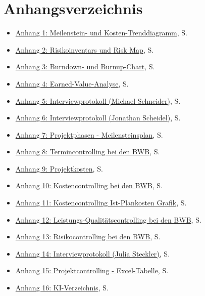 \documentclass[
    12pt, 
    a4paper,
    ]{scrartcl} %
\begin{document}
\section*{Anhangsverzeichnis}
{}
\vspace{0.6cm}
\begin{itemize}
    \item \hyperref[sec:Anhang1]{Anhang 1: Meilenstein- und Kosten-Trenddiagramm}, S. \pageref{sec:Anhang1}
    \item \hyperref[sec:Anhang2]{Anhang 2: Risikoinventars und Risk Map}, S. \pageref{sec:Anhang2}
    \item \hyperref[sec:Anhang3]{Anhang 3: Burndown- und Burnup-Chart}, S. \pageref{sec:Anhang3}
    \item \hyperref[sec:Anhang4]{Anhang 4: Earned-Value-Analyse}, S. \pageref{sec:Anhang4}
    \item \hyperref[sec:Anhang5]{Anhang 5: Interviewprotokoll (Michael Schneider)}, S. \pageref{sec:Anhang5}
    \item \hyperref[sec:Anhang6]{Anhang 6: Interviewprotokoll (Jonathan Scheidel)}, S. \pageref{sec:Anhang6}
    \item \hyperref[sec:Anhang7]{Anhang 7: Projektphasen - Meilensteinsplan}, S. \pageref{sec:Anhang7}
    \item \hyperref[sec:Anhang8]{Anhang 8: Termincontrolling bei den BWB}, S. \pageref{sec:Anhang8}
    \item \hyperref[sec:Anhang9]{Anhang 9: Projektkosten}, S. \pageref{sec:Anhang9}
    \item \hyperref[sec:Anhang10]{Anhang 10: Kostencontrolling bei den BWB}, S. \pageref{sec:Anhang10}
    \item \hyperref[sec:Anhang11]{Anhang 11: Kostencontrolling Ist-Plankosten Grafik}, S. \pageref{sec:Anhang11}
    \item \hyperref[sec:Anhang12]{Anhang 12: Leistungs-Qualitätscontrolling bei den BWB}, S. \pageref{sec:Anhang12}
    \item \hyperref[sec:Anhang13]{Anhang 13: Risikocontrolling bei den BWB}, S. \pageref{sec:Anhang13}
    \item \hyperref[sec:Anhang14]{Anhang 14: Interviewprotokoll (Julia Steckler)}, S. \pageref{sec:Anhang14}
    \item \hyperref[sec:Anhang15]{Anhang 15: Projektcontrolling - Excel-Tabelle}, S. \pageref{sec:Anhang15}
    \item \hyperref[sec:Anhang16]{Anhang 16: KI-Verzeichnis}, S. \pageref{sec:Anhang16}
\end{itemize}
\end{document}
